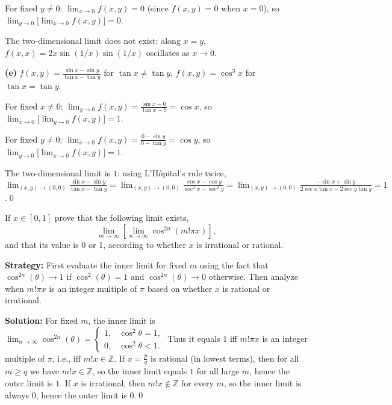 For fixed $y\neq0$: $\lim_{x\to0}f(x,y)=0$ (since $f(x,y)=0$ when $x=0$), so $\lim_{y\to0}\big[\lim_{x\to0}f(x,y)\big]=0$.

The two-dimensional limit does not exist: along $x=y$, $f(x,x)=2x\sin(1/x)\sin(1/x)$ oscillates as $x\to0$.

\noindent\textbf{(e)} $f(x,y)=\frac{\sin x-\sin y}{\tan x-\tan y}$ for $\tan x\neq\tan y$, $f(x,y)=\cos^3x$ for $\tan x=\tan y$.

For fixed $x\neq0$: $\lim_{y\to0}f(x,y)=\frac{\sin x-0}{\tan x-0}=\cos x$, so $\lim_{x\to0}\big[\lim_{y\to0}f(x,y)\big]=1$.

For fixed $y\neq0$: $\lim_{x\to0}f(x,y)=\frac{0-\sin y}{0-\tan y}=\cos y$, so $\lim_{y\to0}\big[\lim_{x\to0}f(x,y)\big]=1$.

The two-dimensional limit is $1$: using L'Hôpital's rule twice, $\lim_{(x,y)\to(0,0)}\frac{\sin x-\sin y}{\tan x-\tan y}=\lim_{(x,y)\to(0,0)}\frac{\cos x-\cos y}{\sec^2x-\sec^2y}=\lim_{(x,y)\to(0,0)}\frac{-\sin x+\sin y}{2\sec x\tan x-2\sec y\tan y}=1$.\qed



\begin{problembox}
\begin{problemstatement}
If \( x \in [0, 1] \) prove that the following limit exists,
\[\lim_{m \to \infty} \left[ \lim_{n \to \infty} \cos^{2n} (m! \pi x) \right],\]
and that its value is 0 or 1, according to whether \( x \) is irrational or rational.
\end{problemstatement}
\end{problembox}

\noindent\textbf{Strategy:} First evaluate the inner limit for fixed $m$ using the fact that $\cos^{2n}(\theta) \to 1$ if $\cos^2(\theta) = 1$ and $\cos^{2n}(\theta) \to 0$ otherwise. Then analyze when $m!\pi x$ is an integer multiple of $\pi$ based on whether $x$ is rational or irrational.

\bigskip\noindent\textbf{Solution:}
For fixed $m$, the inner limit is $\lim_{n\to\infty}\cos^{2n}(\theta)=\begin{cases}1,& \cos^2\theta=1,\\ 0,& \cos^2\theta<1.\end{cases}$ Thus it equals $1$ iff $m!\pi x$ is an integer multiple of $\pi$, i.e., iff $m!x\in\mathbb{Z}$. If $x=\tfrac{p}{q}$ is rational (in lowest terms), then for all $m\ge q$ we have $m!x\in\mathbb{Z}$, so the inner limit equals $1$ for all large $m$, hence the outer limit is $1$. If $x$ is irrational, then $m!x\notin\mathbb{Z}$ for every $m$, so the inner limit is always $0$, hence the outer limit is $0$.\qed

